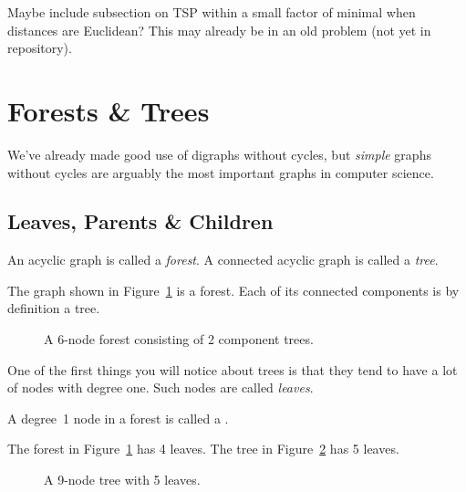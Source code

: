 \begin{editingnotes}
Maybe include subsection on TSP within a small factor of minimal when
distances are Euclidean?  This may already be in an old problem (not yet in repository).
\end{editingnotes}

\section{Forests \& Trees}\label{trees-sec}
We've already made good use of digraphs without cycles, but
\emph{simple} graphs without cycles are arguably the most important
graphs in computer science.

\iffalse
As we have just seen, finding good cycles in a graph can be trickier than
you might first think.  But what if a graph has no cycles at all?  Sounds
pretty dull.
  But graphs without cycles, called \emph{acyclic graphs}, are
probably the most important graphs of all when it comes to computer
science.\fi

\subsection{Leaves, Parents \& Children}

\begin{definition}\label{def:tree}
An acyclic graph is called a \emph{forest}.  A connected acyclic graph
is called a \emph{tree}.
\end{definition}

The graph shown in Figure~\ref{fig:5I} is a forest.  Each of its
connected components is by definition a tree.

\begin{figure}


\caption{A 6-node forest consisting of 2 component trees.}
\label{fig:5I}
\end{figure}

One of the first things you will notice about trees is that they tend
to have a lot of nodes with degree one.  Such nodes are called
\emph{leaves}.

\begin{definition}
A degree~1 node in a forest is called a .
\end{definition}

The forest in Figure~\ref{fig:5I} has 4 leaves.  The tree in
Figure~\ref{fig:5H} has 5 leaves.
\begin{figure}


\caption{A 9-node tree with 5 leaves.}

\label{fig:5H}
\end{figure}


